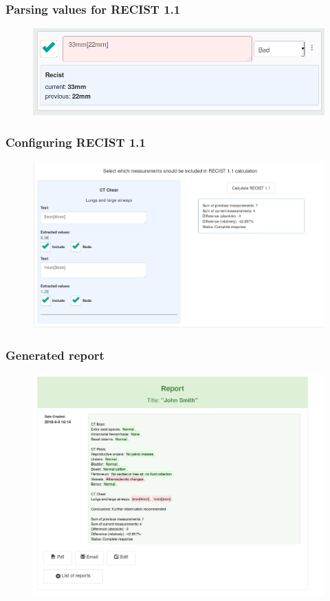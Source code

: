 \documentclass{beamer}
\begin{document}
\begin{frame}
\frametitle{Parsing values for RECIST 1.1}
\begin{figure}
	\centering
	\includegraphics[width=1\linewidth]{../recist-parsing}
	\label{fig:recist-parsing}
\end{figure}
\end{frame}


\begin{frame}
\frametitle{Configuring RECIST 1.1}
\begin{figure}
	\centering
	\includegraphics[width=1\linewidth]{../recist-config}
	\label{fig:recist-config}
\end{figure}
\end{frame}


\begin{frame}
\frametitle{Generated report}
\begin{figure}
	\centering
	\includegraphics[width=1\linewidth]{../report-copy-to-clipboard}
	\label{fig:report-copy-to-clipboard}
\end{figure}
\end{frame}
\end{document}
